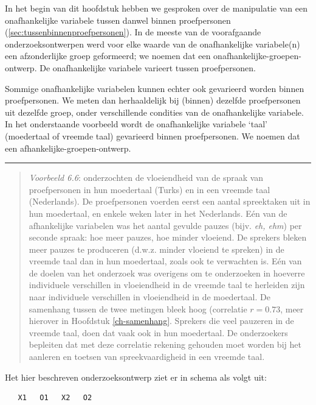 \documentclass[
]{book}
\begin{document}
In het begin van dit hoofdstuk hebben we gesproken over de manipulatie
van een onafhankelijke variabele tussen danwel binnen proefpersonen (\ref{sec:tussenbinnenproefpersonen}).
In de meeste van de voorafgaande onderzoeksontwerpen werd voor elke
waarde van de onafhankelijke variabele(n) een afzonderlijke groep
geformeerd; we noemen dat een onafhankelijke-groepen-ontwerp. De
onafhankelijke variabele varieert tussen proefpersonen.

Sommige onafhankelijke variabelen kunnen echter ook gevarieerd worden
binnen proefpersonen. We meten dan herhaaldelijk bij (binnen) dezelfde
proefpersonen uit dezelfde groep, onder verschillende condities van de
onafhankelijke variabele. In het onderstaande voorbeeld wordt de
onafhankelijke variabele `taal' (moedertaal of vreemde taal) gevarieerd
binnen proefpersonen. We noemen dat een afhankelijke-groepen-ontwerp.

\begin{center}\rule{0.5\linewidth}{0.5pt}\end{center}

\begin{quote}
\emph{Voorbeeld 6.6}:
\citep{JGSH13} onderzochten de vloeiendheid van de spraak van proefpersonen in hun
moedertaal (Turks) en in een vreemde taal (Nederlands). De proefpersonen
voerden eerst een aantal spreektaken uit in hun moedertaal, en enkele
weken later in het Nederlands. Eén van de afhankelijke variabelen was
het aantal gevulde pauzes (bijv. \emph{eh, ehm}) per seconde spraak: hoe meer
pauzes, hoe minder vloeiend. De sprekers bleken meer pauzes te
produceren (d.w.z. minder vloeiend te spreken) in de vreemde taal dan in
hun moedertaal, zoals ook te verwachten is. Eén van de doelen van het
onderzoek was overigens om te onderzoeken in hoeverre individuele
verschillen in vloeiendheid in de vreemde taal te herleiden zijn naar
individuele verschillen in vloeiendheid in de moedertaal. De samenhang
tussen de twee metingen bleek hoog (correlatie \(r=0.73\), meer hierover
in Hoofdstuk \ref{ch-samenhang}. Sprekers die veel pauzeren in de vreemde
taal, doen dat vaak ook in hun moedertaal. De onderzoekers bepleiten dat
met deze correlatie rekening gehouden moet worden bij het aanleren en
toetsen van spreekvaardigheid in een vreemde taal.
\end{quote}

Het hier beschreven onderzoeksontwerp ziet er in schema als volgt uit:

\begin{verbatim}
   X1   O1   X2   O2
\end{verbatim}
\end{document}
